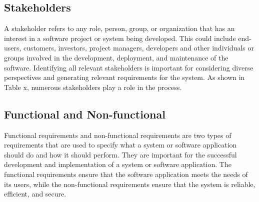 \subsection{Stakeholders}
A stakeholder refers to any role, person, group, or organization that has an interest in a software project or system being developed. This could include end-users, customers, investors, project managers, developers and other individuals or groups involved in the development, deployment, and maintenance of the software.
Identifying all relevant stakeholders is important for considering diverse perspectives and generating relevant requirements for the system. As shown in Table x, numerous stakeholders play a role in the process.

\subsection{Functional and Non-functional}
Functional requirements and non-functional requirements are two types of requirements that are used to specify what a system or software application should do and how it should perform.
They are important for the successful development and implementation of a system or software application. The functional requirements ensure that the software application meets the needs of its users, while the non-functional requirements ensure that the system is reliable, efficient, and secure.


